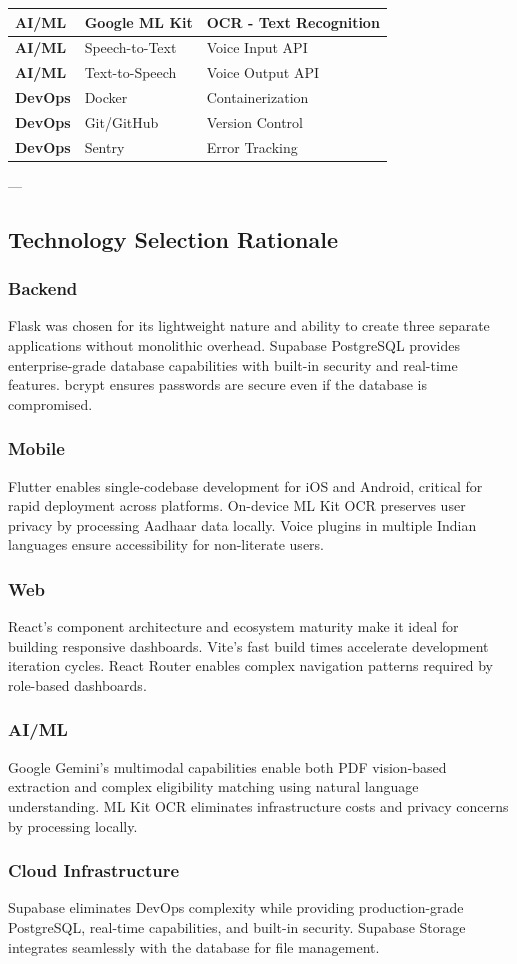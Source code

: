 \begin{table}[H]
\begin{tabularx}{\textwidth}{|l|l|X|}
\hline
\textbf{AI/ML} & Google ML Kit & OCR - Text Recognition \\
\hline
\textbf{AI/ML} & Speech-to-Text & Voice Input API \\
\hline
\textbf{AI/ML} & Text-to-Speech & Voice Output API \\
\hline
\textbf{DevOps} & Docker & Containerization \\
\hline
\textbf{DevOps} & Git/GitHub & Version Control \\
\hline
\textbf{DevOps} & Sentry & Error Tracking \\
\hline
\end{tabularx}
\end{table}

---

\subsection{Technology Selection Rationale}

\subsubsection{Backend}
Flask was chosen for its lightweight nature and ability to create three separate applications without monolithic overhead. Supabase PostgreSQL provides enterprise-grade database capabilities with built-in security and real-time features. bcrypt ensures passwords are secure even if the database is compromised.

\subsubsection{Mobile}
Flutter enables single-codebase development for iOS and Android, critical for rapid deployment across platforms. On-device ML Kit OCR preserves user privacy by processing Aadhaar data locally. Voice plugins in multiple Indian languages ensure accessibility for non-literate users.

\subsubsection{Web}
React's component architecture and ecosystem maturity make it ideal for building responsive dashboards. Vite's fast build times accelerate development iteration cycles. React Router enables complex navigation patterns required by role-based dashboards.

\subsubsection{AI/ML}
Google Gemini's multimodal capabilities enable both PDF vision-based extraction and complex eligibility matching using natural language understanding. ML Kit OCR eliminates infrastructure costs and privacy concerns by processing locally.

\subsubsection{Cloud Infrastructure}
Supabase eliminates DevOps complexity while providing production-grade PostgreSQL, real-time capabilities, and built-in security. Supabase Storage integrates seamlessly with the database for file management.
